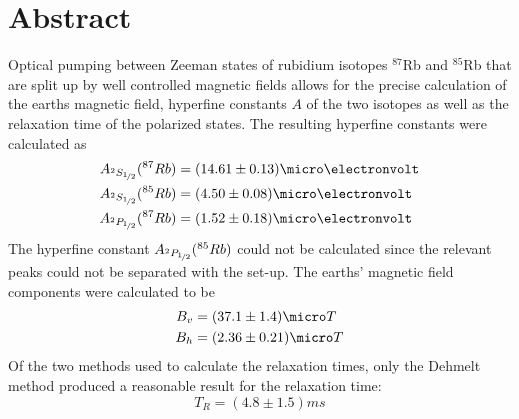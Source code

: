 \section{Abstract}
Optical pumping between Zeeman states of rubidium isotopes $^{87}$Rb and $^{85}$Rb that are split up by well controlled magnetic fields allows for the precise calculation of the earths magnetic field, hyperfine constants $A$ of the two isotopes as well as the relaxation time of the polarized states. The resulting hyperfine constants were calculated as
\begin{align}
	A_{^2S_{\nicefrac{1}{2}}}(^{87}Rb)&=\unit{(14.61\pm0.13)}{\micro\electronvolt}\\
	A_{^2S_{\nicefrac{1}{2}}}(^{85}Rb)&=\unit{(4.50\pm0.08)}{\micro\electronvolt}\\
	A_{^2P_{\nicefrac{1}{2}}}(^{87}Rb)&=\unit{(1.52\pm0.18)}{\micro\electronvolt}
\end{align}
The hyperfine constant $A_{^2P_{\nicefrac{1}{2}}}(^{85}Rb)$ could not be calculated since the relevant peaks could not be separated with the set-up.
The earths' magnetic field components were calculated to be
\begin{align}
	B_v&=\unit{(37.1\pm1.4)}{\micro T}\\
	B_h&=\unit{(2.36\pm 0.21)}{\micro T}
\end{align}
Of the two methods used to calculate the relaxation times, only the Dehmelt method produced a reasonable result for the relaxation time:
\begin{equation}
T_R=\unit{(4.8\pm1.5)}{ms}
\end{equation}